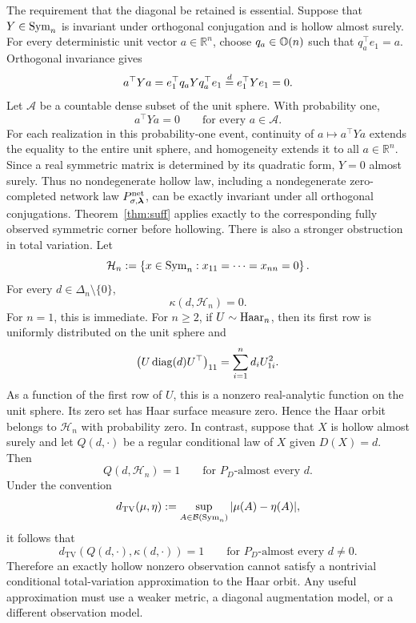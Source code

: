 \begin{remark}
\label{srem:hollowtv}
The requirement that the diagonal be retained is essential. Suppose
that \(Y\in\mathrm{Sym}_n\) is invariant under orthogonal conjugation and is
hollow almost surely. For every deterministic unit vector
\(a\in\mathbb R^n\), choose \(q_a\in\mathbb{O}(n)\) such that
\(q_a^\top e_1=a\). Orthogonal invariance gives
\[
a^\top Ya
=
e_1^\top q_aYq_a^\top e_1
\overset{d}{=}
e_1^\top Ye_1
=
0.
\]
Let \(\mathcal A\) be a countable dense subset of the unit sphere.
With probability one,
\[
a^\top Ya=0
\qquad\text{for every }a\in\mathcal A.
\]
For each realization in this probability-one event, continuity of
\(a\mapsto a^\top Ya\) extends the equality to the entire unit sphere,
and homogeneity extends it to all \(a\in\mathbb R^n\). Since a real
symmetric matrix is determined by its quadratic form, \(Y=0\) almost
surely.
Thus no nondegenerate hollow law, including a nondegenerate
zero-completed network law
\(P^{\mathrm{net}}_{\sigma,\bm{\lambda}}\), can be exactly invariant under
all orthogonal conjugations. Theorem~\ref{thm:suff} applies exactly to
the corresponding fully observed symmetric corner before hollowing.
There is also a stronger obstruction in total variation. Let
\[
\mathcal H_n
:=
\left\{
x\in\mathrm{Sym}_n:
x_{11}=\cdots=x_{nn}=0
\right\}.
\]
For every \(d\in\Delta_n\setminus\{0\}\),
\[
\kappa(d,\mathcal H_n)=0.
\]
For \(n=1\), this is immediate. For \(n\geq2\), if
\(U\sim\mathrm{Haar}_n\), then its first row is uniformly distributed on the
unit sphere and
\[
\left(U\operatorname{diag}(d)U^\top\right)_{11}
=
\sum_{i=1}^n d_iU_{1i}^2.
\]
As a function of the first row of \(U\), this is a nonzero
real-analytic function on the unit sphere. Its zero set has Haar
surface measure zero. Hence the Haar orbit belongs to
\(\mathcal H_n\) with probability zero.
In contrast, suppose that \(X\) is hollow almost surely and let
\(Q(d,\cdot)\) be a regular conditional law of \(X\) given
\(D(X)=d\). Then
\[
Q(d,\mathcal H_n)=1
\qquad
\text{for \(P_D\)-almost every }d.
\]
Under the convention
\[
d_{\mathrm{TV}}(\mu,\eta)
:=
\sup_{A\in\mathcal B(\mathrm{Sym}_n)}
|\mu(A)-\eta(A)|,
\]
it follows that
\[
d_{\mathrm{TV}}\!\left(
Q(d,\cdot),\kappa(d,\cdot)
\right)
=
1
\qquad
\text{for \(P_D\)-almost every }d\neq0.
\]
Therefore an exactly hollow nonzero observation cannot satisfy a
nontrivial conditional total-variation approximation to the Haar
orbit. Any useful approximation must use a weaker metric, a diagonal
augmentation model, or a different observation model.
\end{remark}

